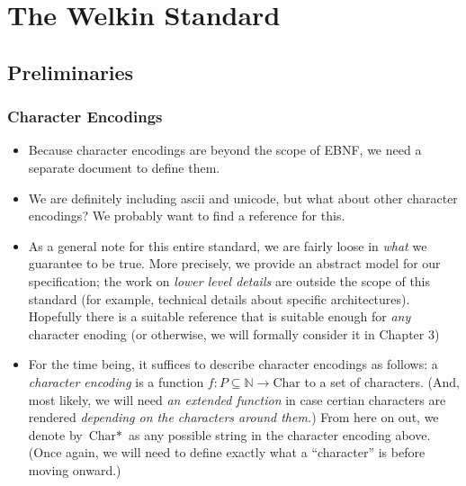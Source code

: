 
\chapter{The Welkin Standard}

\section{Preliminaries}

\subsection{Character Encodings}
\begin{itemize}
  \item Because character encodings are beyond the scope of EBNF, we need a separate document to define them.
  \item We are definitely including ascii and unicode, but what about other character encodings? We probably want to find a reference for this.
	\item As a general note for this entire standard, we are fairly loose in \textit{what} we guarantee to be true. More precisely, we provide an abstract model for our specification; the work on \textit{lower level details} are outside the scope of this standard (for example, technical details about specific architectures). Hopefully there is a suitable reference that is suitable enough for \textit{any} character enoding (or otherwise, we will formally consider it in Chapter 3)
	\item For the time being, it suffices to describe character encodings as follows: a \textit{character encoding} is a function $f: P \subseteq \mathbb{N} \rightarrow \textrm{Char}$ to a set of characters. (And, most likely, we will need \textit{an extended function} in case certian characters are rendered \textit{depending on the characters around them.}) From here on out, we denote by $\textrm{Char}*$ as any possible string in the character encoding above. (Once again, we will need to define exactly what a ``character'' is before moving onward.)
\end{itemize}

